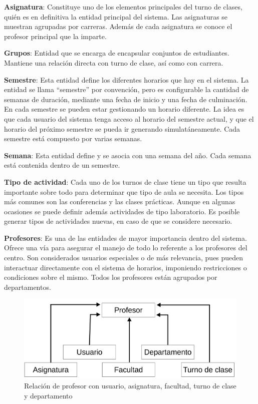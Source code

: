 \textbf{Asignatura}: Constituye uno de los elementos principales del turno de clases, quién es en definitiva la entidad principal del sistema. Las asignaturas se muestran agrupadas por carreras. Además de cada asignatura se conoce el profesor principal que la imparte.

\textbf{Grupos}: Entidad que se encarga de encapsular conjuntos de estudiantes. Mantiene una relación directa con turno de clase, así como con carrera. 

\textbf{Semestre}: Esta entidad define los diferentes horarios que hay en el sistema. La entidad se llama
“semestre” por convención, pero es configurable la cantidad de semanas de duración, mediante una fecha de inicio y una fecha de culminación. En cada semestre
se pueden estar gestionando un horario diferente. La idea es que cada usuario del sistema tenga acceso al horario del semestre actual, y que el horario del próximo semestre se pueda ir generando simulatáneamente. Cada semestre está compuesto por varias semanas.

\textbf{Semana}: Esta entidad define y se asocia con una semana del año. Cada semana está contenida dentro de un semestre.

\textbf{Tipo de actividad}: Cada uno de los turnos de clase tiene un tipo que resulta importante sobre todo
 para determinar que tipo de aula se necesita. Los tipos más comunes son las conferencias y las clases
 prácticas. Aunque en algunas ocasiones se puede definir además actividades de tipo laboratorio. Es posible generar tipos de actividades nuevas, en caso de que se considere necesario.

\textbf{Profesores}: Es una de las entidades de mayor importancia dentro del sistema. Ofrece una vía para asegurar el manejo de todo lo referente a los profesores del centro. Son considerados usuarios especiales o de más relevancia, pues pueden interactuar directamente con el sistema de horarios, imponiendo restricciones o condiciones sobre el mismo. Todos los profesores están agrupados por departamentos.

\begin{figure}[h!]
	\centering
	\includegraphics[width=0.75\linewidth]{images/Chapter 2/teacher_relation}
	\caption{Relación de profesor con usuario, asignatura, facultad, turno de clase y departamento }
	\label{fig:teacher_relation}
\end{figure}

